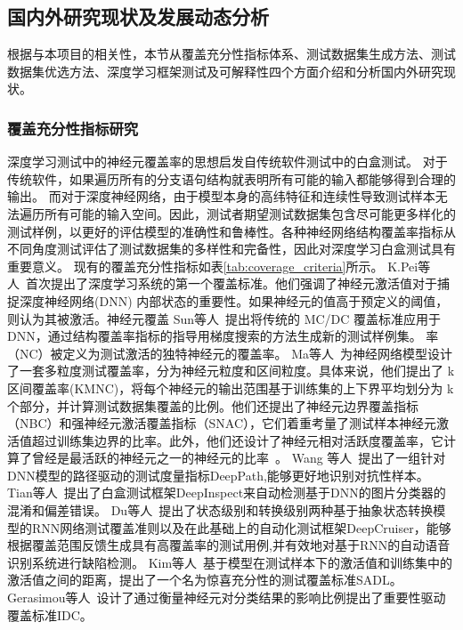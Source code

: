 \subsection{国内外研究现状及发展动态分析}\label{relatedwork}


根据与本项目的相关性，本节从覆盖充分性指标体系、测试数据集生成方法、测试数据集优选方法、深度学习框架测试及可解释性四个方面介绍和分析国内外研究现状。




\subsubsection{覆盖充分性指标研究}
深度学习测试中的神经元覆盖率的思想启发自传统软件测试中的白盒测试。
对于传统软件，如果遍历所有的分支语句结构就表明所有可能的输入都能够得到合理的输出。
而对于深度神经网络，由于模型本身的高纬特征和连续性导致测试样本无法遍历所有可能的输入空间。因此，测试者期望测试数据集包含尽可能更多样化的测试样例，以更好的评估模型的准确性和鲁棒性。各种神经网络结构覆盖率指标从不同角度测试评估了测试数据集的多样性和完备性，因此对深度学习白盒测试具有重要意义。 
现有的覆盖充分性指标如表\cref{tab:coverage_criteria}所示。
K.Pei等人~首次提出了深度学习系统的第一个覆盖标准。他们强调了神经元激活值对于捕捉深度神经网络(DNN) 内部状态的重要性。如果神经元的值高于预定义的阈值，则认为其被激活。神经元覆盖
Sun等人~提出将传统的 MC/DC 覆盖标准应用于DNN，通过结构覆盖率指标的指导用梯度搜索的方法生成新的测试样例集。
率（NC）被定义为测试激活的独特神经元的覆盖率。
Ma等人~为神经网络模型设计了一套多粒度测试覆盖率，分为神经元粒度和区间粒度。具体来说，他们提出了 k区间覆盖率(KMNC)，将每个神经元的输出范围基于训练集的上下界平均划分为 k个部分，并计算测试数据集覆盖的比例。他们还提出了神经元边界覆盖指标（NBC）和强神经元激活覆盖指标（SNAC），它们着重考量了测试样本神经元激活值超过训练集边界的比率。此外，他们还设计了神经元相对活跃度覆盖率，它计算了曾经是最活跃的神经元之一的神经元的比率~。
Wang 等人~提出了一组针对DNN模型的路径驱动的测试度量指标DeepPath,能够更好地识别对抗性样本。
Tian等人~提出了白盒测试框架DeepInspect来自动检测基于DNN的图片分类器的混淆和偏差错误。
Du等人~提出了状态级别和转换级别两种基于抽象状态转换模型的RNN网络测试覆盖准则以及在此基础上的自动化测试框架DeepCruiser，能够根据覆盖范围反馈生成具有高覆盖率的测试用例,并有效地对基于RNN的自动语音识别系统进行缺陷检测。
Kim等人~基于模型在测试样本下的激活值和训练集中的激活值之间的距离，提出了一个名为惊喜充分性的测试覆盖标准SADL。
Gerasimou等人~设计了通过衡量神经元对分类结果的影响比例提出了重要性驱动覆盖标准IDC。

